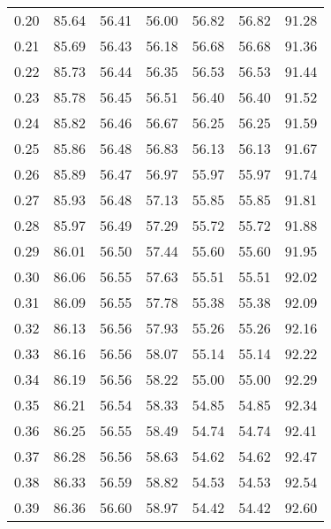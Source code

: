 \begin{tabular}{|c|c|c|c|c|c|c|}
      0.20 &     85.64 &     56.41 &      56.00 &   56.82 &      56.82 &         91.28 \\
      0.21 &     85.69 &     56.43 &      56.18 &   56.68 &      56.68 &         91.36 \\
      0.22 &     85.73 &     56.44 &      56.35 &   56.53 &      56.53 &         91.44 \\
      0.23 &     85.78 &     56.45 &      56.51 &   56.40 &      56.40 &         91.52 \\
      0.24 &     85.82 &     56.46 &      56.67 &   56.25 &      56.25 &         91.59 \\
      0.25 &     85.86 &     56.48 &      56.83 &   56.13 &      56.13 &         91.67 \\
      0.26 &     85.89 &     56.47 &      56.97 &   55.97 &      55.97 &         91.74 \\
      0.27 &     85.93 &     56.48 &      57.13 &   55.85 &      55.85 &         91.81 \\
      0.28 &     85.97 &     56.49 &      57.29 &   55.72 &      55.72 &         91.88 \\
      0.29 &     86.01 &     56.50 &      57.44 &   55.60 &      55.60 &         91.95 \\
      0.30 &     86.06 &     56.55 &      57.63 &   55.51 &      55.51 &         92.02 \\
      0.31 &     86.09 &     56.55 &      57.78 &   55.38 &      55.38 &         92.09 \\
      0.32 &     86.13 &     56.56 &      57.93 &   55.26 &      55.26 &         92.16 \\
      0.33 &     86.16 &     56.56 &      58.07 &   55.14 &      55.14 &         92.22 \\
      0.34 &     86.19 &     56.56 &      58.22 &   55.00 &      55.00 &         92.29 \\
      0.35 &     86.21 &     56.54 &      58.33 &   54.85 &      54.85 &         92.34 \\
      0.36 &     86.25 &     56.55 &      58.49 &   54.74 &      54.74 &         92.41 \\
      0.37 &     86.28 &     56.56 &      58.63 &   54.62 &      54.62 &         92.47 \\
      0.38 &     86.33 &     56.59 &      58.82 &   54.53 &      54.53 &         92.54 \\
      0.39 &     86.36 &     56.60 &      58.97 &   54.42 &      54.42 &         92.60 \\

\end{tabular}
